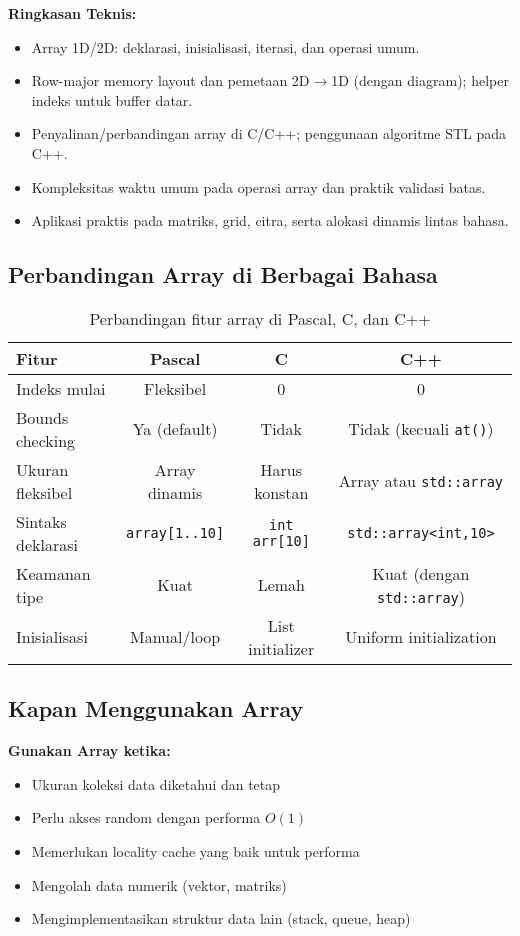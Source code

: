 \documentclass[../main.tex]{subfiles}
\begin{document}
\textbf{Ringkasan Teknis:}
\begin{itemize}
  \item Array 1D/2D: deklarasi, inisialisasi, iterasi, dan operasi umum.
  \item Row-major memory layout dan pemetaan 2D\(\to\)1D (dengan diagram); helper indeks untuk buffer datar.
  \item Penyalinan/perbandingan array di C/C++; penggunaan algoritme STL pada C++.
  \item Kompleksitas waktu umum pada operasi array dan praktik validasi batas.
  \item Aplikasi praktis pada matriks, grid, citra, serta alokasi dinamis lintas bahasa.
\end{itemize}

\subsection{Perbandingan Array di Berbagai Bahasa}

\begin{table}[H]
\centering
\begin{tabular}{|l|c|c|c|}
\hline
\textbf{Fitur} & \textbf{Pascal} & \textbf{C} & \textbf{C++} \\
\hline
Indeks mulai & Fleksibel & 0 & 0 \\
\hline
Bounds checking & Ya (default) & Tidak & Tidak (kecuali \texttt{at()}) \\
\hline
Ukuran fleksibel & Array dinamis & Harus konstan & Array atau \texttt{std::array} \\
\hline
Sintaks deklarasi & \texttt{array[1..10]} & \texttt{int arr[10]} & \texttt{std::array<int,10>} \\
\hline
Keamanan tipe & Kuat & Lemah & Kuat (dengan \texttt{std::array}) \\
\hline
Inisialisasi & Manual/loop & List initializer & Uniform initialization \\
\hline
\end{tabular}
\caption{Perbandingan fitur array di Pascal, C, dan C++}
\end{table}

\subsection{Kapan Menggunakan Array}

\textbf{Gunakan Array ketika:}
\begin{itemize}
  \item Ukuran koleksi data diketahui dan tetap
  \item Perlu akses random dengan performa \(O(1)\)
  \item Memerlukan locality cache yang baik untuk performa
  \item Mengolah data numerik (vektor, matriks)
  \item Mengimplementasikan struktur data lain (stack, queue, heap)
\end{itemize}
\end{document}
